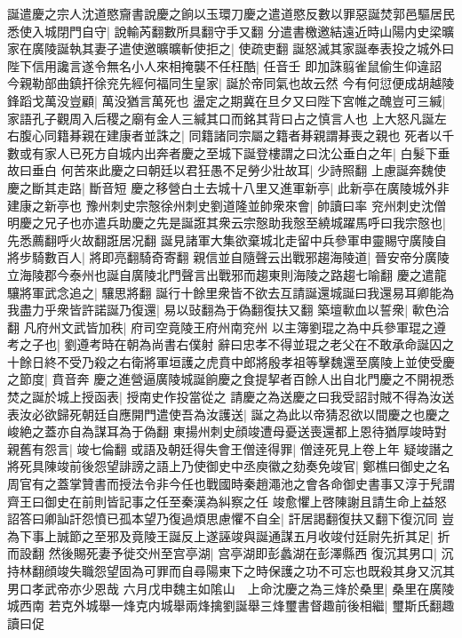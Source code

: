 誕遣慶之宗人沈道愍齎書說慶之餉以玉環刀慶之遣道愍反數以罪惡誕焚郭邑驅居民悉使入城閉門自守|{
	說輸芮翻數所具翻守手又翻}
分遣書檄邀結遠近時山陽内史梁曠家在廣陵誕執其妻子遣使邀曠曠斬使拒之|{
	使疏吏翻}
誕怒滅其家誕奉表投之城外曰陛下信用讒言遂令無名小人來相掩襲不任枉酷|{
	任音壬}
即加誅翦雀鼠偷生仰違詔今親勒部曲鎮扞徐兖先經何福同生皇家|{
	誕於帝同氣也故云然}
今有何愆便成胡越陵鋒蹈戈萬没豈顧|{
	萬没猶言萬死也}
盪定之期冀在旦夕又曰陛下宮帷之醜豈可三緘|{
	家語孔子觀周入后稷之廟有金人三緘其口而銘其背曰占之慎言人也}
上大怒凡誕左右腹心同籍朞親在建康者並誅之|{
	同籍諸同宗屬之籍者朞親謂朞喪之親也}
死者以千數或有家人已死方自城内出奔者慶之至城下誕登樓謂之曰沈公垂白之年|{
	白髮下垂故曰垂白}
何苦來此慶之曰朝廷以君狂愚不足勞少壯故耳|{
	少詩照翻}
上慮誕奔魏使慶之斷其走路|{
	斷音短}
慶之移營白土去城十八里又進軍新亭|{
	此新亭在廣陵城外非建康之新亭也}
豫州刺史宗慤徐州刺史劉道隆並帥衆來會|{
	帥讀曰率}
兖州刺史沈僧明慶之兄子也亦遣兵助慶之先是誕誑其衆云宗慤助我慤至繞城躍馬呼曰我宗慤也|{
	先悉薦翻呼火故翻誑居况翻}
誕見諸軍大集欲棄城北走留中兵參軍申靈賜守廣陵自將步騎數百人|{
	將即亮翻騎奇寄翻}
親信並自隨聲云出戰邪趨海陵道|{
	晉安帝分廣陵立海陵郡今泰州也誕自廣陵北門聲言出戰邪而趨東則海陵之路趨七喻翻}
慶之遣龍驤將軍武念追之|{
	驤思將翻}
誕行十餘里衆皆不欲去互請誕還城誕曰我還易耳卿能為我盡力乎衆皆許諾誕乃復還|{
	易以䜴翻為于偽翻復扶又翻}
築壇㰱血以誓衆|{
	㰱色洽翻}
凡府州文武皆加秩|{
	府司空竟陵王府州南兖州}
以主簿劉琨之為中兵參軍琨之遵考之子也|{
	劉遵考時在朝為尚書右僕射}
辭曰忠孝不得並琨之老父在不敢承命誕囚之十餘日終不受乃殺之右衛將軍垣護之虎賁中郎將殷孝祖等擊魏還至廣陵上並使受慶之節度|{
	賁音奔}
慶之進營逼廣陵城誕餉慶之食提挈者百餘人出自北門慶之不開視悉焚之誕於城上授函表|{
	授南史作投當從之}
請慶之為送慶之曰我受詔討賊不得為汝送表汝必欲歸死朝廷自應開門遣使吾為汝護送|{
	誕之為此以帝猜忍欲以間慶之也慶之峻絶之蓋亦自為謀耳為于偽翻}
東揚州刺史顔竣遭母憂送喪還都上恩待猶厚竣時對親舊有怨言|{
	竣七倫翻}
或語及朝廷得失會王僧逹得罪|{
	僧逹死見上卷上年}
疑竣譖之將死具陳竣前後怨望誹謗之語上乃使御史中丞庾徽之劾奏免竣官|{
	鄭樵曰御史之名周官有之蓋掌贊書而授法令非今任也戰國時秦趙澠池之會各命御史書事又淳于髠謂齊王曰御史在前則皆記事之任至秦漢為糾察之任}
竣愈懼上啓陳謝且請生命上益怒詔答曰卿訕訐怨憤已孤本望乃復過煩思慮懼不自全|{
	訐居謁翻復扶又翻下復沉同}
豈為下事上誠節之至邪及竟陵王誕反上遂誣竣與誕通謀五月收竣付廷尉先折其足|{
	折而設翻}
然後賜死妻予徙交州至宫亭湖|{
	宫亭湖即彭蠡湖在彭澤縣西}
復沉其男口|{
	沉持林翻顔竣失職怨望固為可罪而自尋陽東下之時保護之功不可忘也既殺其身又沉其男口孝武帝亦少恩哉}
六月戊申魏主如隂山　上命沈慶之為三烽於桑里|{
	桑里在廣陵城西南}
若克外城舉一烽克内城舉兩烽擒劉誕舉三烽璽書督趣前後相繼|{
	璽斯氏翻趣讀曰促}
